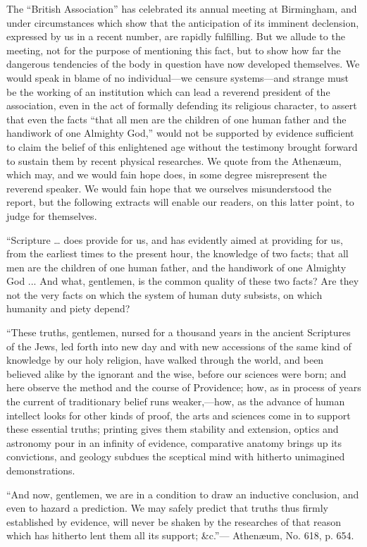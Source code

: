 The ``British Association'' has celebrated its annual
meeting at Birmingham, and under circumstances which show that the
anticipation of its imminent declension, expressed by us in a recent
number, are rapidly fulfilling. But we allude to the meeting, not for
the purpose of mentioning this fact, but to show how far the dangerous
tendencies of the body in question have now developed themselves. We
would speak in blame of no individual—we censure systems—and strange
must be the working of an institution which can lead a reverend
president of the association, even in the act of formally defending its
religious character, to assert that even the facts ``that all men are the
children of one human father and the handiwork of one Almighty God,''
would not be supported by evidence sufficient to claim the belief of
this enlightened age without the testimony brought forward to sustain
them by recent physical researches. We quote from the Athenæum, which
may, and we would fain hope does, in some degree misrepresent the
reverend speaker. We would fain hope that we ourselves misunderstood the
report, but the following extracts will enable our readers, on this
latter point, to judge for themselves.

``Scripture … does provide for us, and has
evidently aimed at providing for us, from the earliest times to the
present hour, the knowledge of two facts; that all men are the
children of one human father, and the handiwork of one Almighty God ...
And what, gentlemen, is the common quality of these two facts? Are they
not the very facts on which the system of human duty subsists, on which
humanity and piety depend?

``These truths, gentlemen, nursed for a thousand
years in the ancient Scriptures of the Jews, led forth into new day and
with new accessions of the same kind of knowledge by our holy religion,
have walked through the world, and been believed alike by the ignorant
and the wise, before our sciences were born; and here observe the method
and the course of Providence; how, as in process of years the current of
traditionary belief runs weaker,—how, as the advance of human
intellect looks for other kinds of proof, the arts and sciences come in
to support these essential truths; printing gives them stability and
extension, optics and astronomy pour in an infinity of evidence,
comparative anatomy brings up its convictions, and geology subdues the
sceptical mind with hitherto unimagined demonstrations.

``And now, gentlemen, we are in a condition to draw
an inductive conclusion, and even to hazard a prediction. We may safely
predict that truths thus firmly established by evidence, will never be
shaken by the researches of that reason which has hitherto lent them all
its support; \&c.''— Athenæum, No. 618, p. 654.

